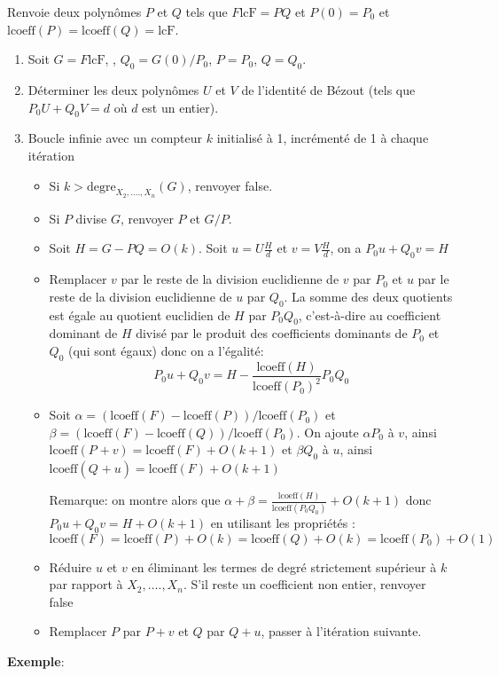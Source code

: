 \documentclass[a4paper,11pt]{article}
\begin{document}
Renvoie deux polynômes $P$ et $Q$ tels que $F \mbox{lcF} = P Q$ et $P ( 0 ) =
P_0$ et $\mbox{lcoeff} ( P ) = \mbox{lcoeff} ( Q ) = \mbox{lcF}$.
\begin{enumerate}
  \item Soit $G = F \mbox{lcF}$, , $Q_0 = G ( 0 ) / P_0$, $P = P_0$, $Q =
  Q_0$.
  
  \item Déterminer les deux polynômes $U$ et $V$ de l'identité de Bézout
  (tels que $P_0 U + Q_0 V = d$ où $d$ est un entier).
  
  \item Boucle infinie avec un compteur $k$ initialisé à 1, incrémenté de 1 à
  chaque itération
  \begin{itemize}
    \item Si $k > \mbox{degre}_{X_2, \ldots ., X_n} ( G )$, renvoyer false.
    
    \item Si $P$ divise $G$, renvoyer $P$ et $G / P$.
    
    \item Soit $H = G - P Q = O ( k )$. Soit $u = U \frac{H}{d}$ et $v = V
    \frac{H}{d}$, on a $P_0 u + Q_0 v = H$
    
    \item Remplacer $v$ par le reste de la division euclidienne de $v$ par
    $P_0$ et $u$ par le reste de la division euclidienne de $u$ par $Q_0$. La
    somme des deux quotients est égale au quotient euclidien de $H$ par $P_0
    Q_0$, c'est-à-dire au coefficient dominant de $H$ divisé par le produit
    des coefficients dominants de $P_0$ et $Q_0$ (qui sont égaux) donc on a
    l'égalité:
    \[ P_0 u + Q_0 v = H - \frac{\mbox{lcoeff} ( H )}{\mbox{lcoeff} ( P_0
       )^2} P_0 Q_0 \]
    \item Soit
    $\alpha = ( \mbox{lcoeff} ( F ) - \mbox{lcoeff} ( P )) / \mbox{lcoeff} (
    P_0 )$ et $\beta = ( \mbox{lcoeff} ( F ) - \mbox{lcoeff} ( Q )) /
    \mbox{lcoeff} ( P_0 )$.
    On ajoute $\alpha P_0$ à $v$, ainsi $\mbox{lcoeff} ( P_{} + v ) =
    \mbox{lcoeff} ( F ) + O ( k + 1 )$ et $\beta Q_0$ à $u$, ainsi
    $\mbox{lcoeff} ( Q_{} + u ) = \mbox{lcoeff} ( F ) + O ( k + 1 )$ 
    
    Remarque: on montre alors que $\alpha + \beta = \frac{\mbox{lcoeff} ( H
    )}{\mbox{lcoeff} ( P_0 Q_0 )} + O ( k + 1 )$ donc $P_0 u + Q_0 v = H + O (
    k + 1 )$ en utilisant les propriétés :
    \[ \text{$\mbox{lcoeff} ( F ) = \mbox{lcoeff} ( P ) + O ( k ) =
       \mbox{lcoeff} ( Q ) + O ( k ) = \mbox{lcoeff} ( P_0 ) + O ( 1 )$} \]
    \item Réduire $u$ et $v$ en éliminant les termes de degré strictement
    supérieur à $k$ par rapport à $X_2, \ldots ., X_n$. S'il reste un
    coefficient non entier, renvoyer false
    
    \item Remplacer $P$ par $P + v$ et $Q$ par $Q + u$, passer à l'itération
    suivante.
  \end{itemize}
\end{enumerate}
{\bf{Exemple}}:
\end{document}
